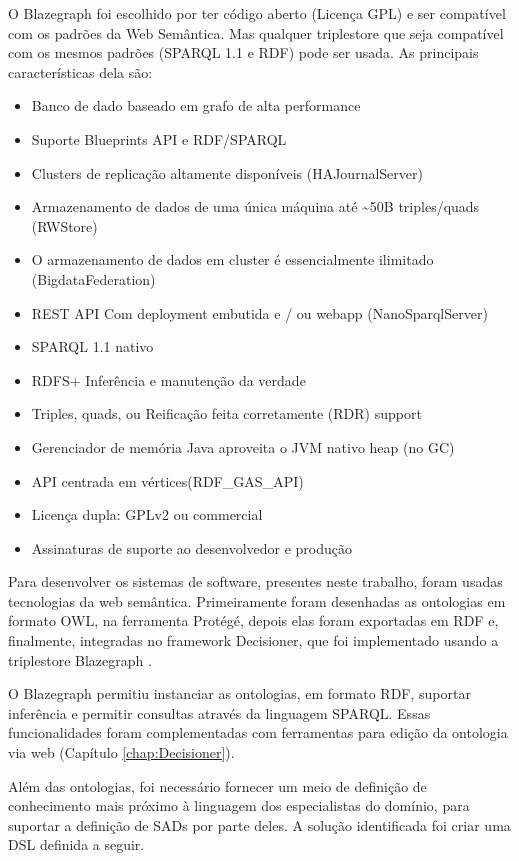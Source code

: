 O Blazegraph foi escolhido por ter código aberto (Licença GPL) e ser
compatível com os padrões da Web Semântica. Mas qualquer \foreignlanguage{english}{triplestore}
que seja compatível com os mesmos padrões (SPARQL 1.1 e RDF) pode
ser usada. As principais características dela são:
\begin{itemize}
\item Banco de dado baseado em grafo de alta performance
\item Suporte Blueprints API e RDF/SPARQL
\item Clusters de replicação altamente disponíveis (HAJournalServer) 
\item Armazenamento de dados de uma única máquina até \textasciitilde{}50B
triples/quads (RWStore) 
\item O armazenamento de dados em cluster é essencialmente ilimitado (BigdataFederation) 
\item REST API Com deployment embutida e / ou webapp (NanoSparqlServer) 
\item SPARQL 1.1 nativo 
\item RDFS+ Inferência e manutenção da verdade
\item Triples, quads, ou Reificação feita corretamente (RDR) support 
\item Gerenciador de memória Java aproveita o JVM nativo heap (no GC) 
\item API centrada em vértices(RDF\_GAS\_API) 
\item Licença dupla: GPLv2 ou commercial 
\item Assinaturas de suporte ao desenvolvedor e produção
\end{itemize}
Para desenvolver os sistemas de software, presentes neste trabalho,
foram usadas tecnologias da web semântica. Primeiramente foram desenhadas
as ontologias em formato \foreignlanguage{english}{OWL,} na ferramenta
Protégé, depois elas foram exportadas em RDF e, finalmente, integradas
no framework Decisioner, que foi implementado usando a triplestore
\foreignlanguage{english}{Blazegraph} .

%
O Blazegraph\foreignlanguage{brazil}{ permitiu instanciar as ontologias,
em formato }RDF,\foreignlanguage{brazil}{ suportar inferência e permitir
consultas através da linguagem }SPARQL.\foreignlanguage{brazil}{ Essas
funcionalidades foram complementadas com ferramentas para edição da
ontologia via web (Capítulo \ref{chap:Decisioner}). }

%
Além das ontologias, foi necessário fornecer um meio de definição
de conhecimento mais próximo à linguagem dos especialistas do domínio,
para suportar a definição de SADs por parte deles. A solução identificada
foi criar uma \foreignlanguage{english}{DSL} definida a seguir.
%

